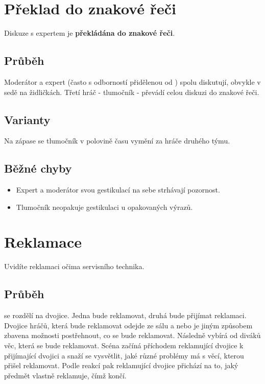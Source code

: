 \documentclass[main.tex]{subfiles}
\begin{document}
 
 
 
 
\needspace{5cm} \section{Překlad do znakové řeči} \label{překlad do znakové řeči}  
 
Diskuze s expertem je \textbf{překládána do znakové řeči}{}. 
 
\subsection{Průběh} Moderátor a expert (často s odborností přidělenou od ) spolu diskutují, obvykle v sedě na židličkách. Třetí hráč  - tlumočník  - převádí celou diskuzi do znakové řeči. 
 
\subsection{Varianty} Na zápase se tlumočník v polovině času vymění za hráče druhého týmu. 
 
\subsection{ Běžné chyby } \begin{itemize}
\item  Expert a moderátor svou gestikulací na sebe strhávají pozornost.
\item  Tlumočník neopakuje gestikulaci u opakovaných výrazů.
\end{itemize}
 
 
 
 
\needspace{5cm} \section{Reklamace} \label{reklamace}  
 
 
Uvidíte reklamaci očima servisního technika. 
 
 
\subsection{ Průběh }  se rozdělí na dvojice. Jedna bude reklamovat, druhá bude přijímat reklamaci. Dvojice hráčů, která bude reklamovat odejde ze sálu a nebo je jiným způsobem zbavena možnosti postřehnout, co se bude reklamovat. Následně  vybírá od diváků věc, která se bude reklamovat. Scéna začíná příchodem reklamující dvojice k přijímající dvojici a snaží se vysvětlit, jaké různé problémy má s věcí, kterou přišel reklamovat. Podle reakcí pak reklamující dvojice přichází na to, jaký předmět vlastně reklamuje, čímž  končí. 
 
\end{document}
